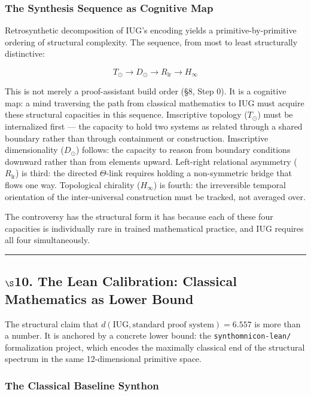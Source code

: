 \documentclass[10pt,a4paper]{article}
\newcommand{\pilcrow}{\S}
\begin{document}
\subsubsection{The Synthesis Sequence as Cognitive Map}

Retrosynthetic decomposition of IUG's encoding yields a primitive-by-primitive ordering
of structural complexity. The sequence, from most to least structurally distinctive:

\[T_\odot \xrightarrow{\ } D_\odot \xrightarrow{\ } R_\text{lr} \xrightarrow{\ } H_{\infty}\]

This is not merely a proof-assistant build order (\pilcrow{}8, Step 0). It is a cognitive map: a
mind traversing the path from classical mathematics to IUG must acquire these structural
capacities in this sequence. Imscriptive topology ($T_\odot$) must be internalized
first --- the capacity to hold two systems as related through a shared boundary rather than
through containment or construction. Imscriptive dimensionality ($D_\odot$) follows:
the capacity to reason from boundary conditions downward rather than from elements upward.
Left-right relational asymmetry ($R_\text{lr}$) is third: the directed $\Theta$-link
requires holding a non-symmetric bridge that flows one way. Topological chirality
($H_{\infty}$) is fourth: the irreversible temporal orientation of the inter-universal
construction must be tracked, not averaged over.

The controversy has the structural form it has because each of these four capacities is
individually rare in trained mathematical practice, and IUG requires all four simultaneously.

\begin{center}
\rule{0.5\textwidth}{0.4pt}
\end{center}

\subsection{$\S$10. The Lean Calibration: Classical Mathematics as Lower Bound}

The structural claim that $d(\text{IUG}, \text{standard proof system}) = 6.557$ is more
than a number. It is anchored by a concrete lower bound: the \texttt{synthomnicon-lean/}
formalization project, which encodes the maximally classical end of the structural spectrum
in the same 12-dimensional primitive space.

\subsubsection{The Classical Baseline Synthon}
\end{document}
